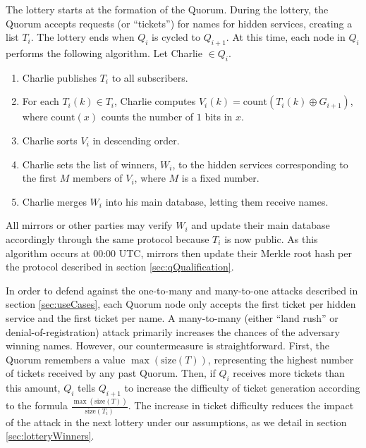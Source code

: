 \documentclass[USenglish,oneside,twocolumn]{article}
\begin{document}
The lottery starts at the formation of the Quorum. During the lottery, the Quorum accepts requests (or ``tickets'') for names for hidden services, creating a list $ T_{i} $. The lottery ends when $ Q_{i} $ is cycled to $ Q_{i + 1} $. At this time, each node in $ Q_{i} $ performs the following algorithm. Let Charlie $ \in Q_{i} $.

\begin{enumerate} %
	\item Charlie publishes $ T_{i} $ to all subscribers.
	\item For each $ T_{i}(k) \in T_{i} $, Charlie computes $ V_{i}(k) = \mathrm{count}(T_{i}(k) \oplus G_{i + 1}) $, where $ \mathrm{count}(x) $ counts the number of $ 1 $ bits in $ x $.
	\item Charlie sorts $ V_{i} $ in descending order.
	\item Charlie sets the list of winners, $ W_{i} $, to the hidden services corresponding to the first $ M $ members of $ V_{i} $, where $ M $ is a fixed number. %
	\item Charlie merges $ W_{i} $ into his main database, letting them receive names.
\end{enumerate}

All mirrors or other parties may verify $ W_{i} $ and update their main database accordingly through the same protocol because $ T_{i} $ is now public. As this algorithm occurs at 00:00 UTC, mirrors then update their Merkle root hash per the protocol described in section \ref{sec:qQualification}.

In order to defend against the one-to-many and many-to-one attacks described in section \ref{sec:useCases}, each Quorum node only accepts the first ticket per hidden service and the first ticket per name. A many-to-many (either ``land rush'' or denial-of-registration) attack primarily increases the chances of the adversary winning names. However, our countermeasure is straightforward. First, the Quorum remembers a value $ \max(\mathrm{size}(T)) $, representing the highest number of tickets received by any past Quorum. Then, if $ Q_{i} $ receives more tickets than this amount, $ Q_{i} $ tells $ Q_{i + 1} $ to increase the difficulty of ticket generation according to the formula $ \frac{\max(\mathrm{size}(T))}{\mathrm{size}(T_{i})} $. The increase in ticket difficulty reduces the impact of the attack in the next lottery under our assumptions, as we detail in section \ref{sec:lotteryWinners}.
\end{document}
